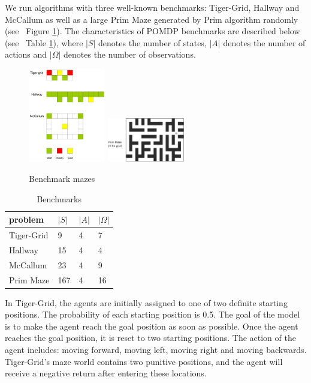 \documentclass{article}
\begin{document}
We run algorithms with three well-known benchmarks: Tiger-Grid, Hallway and McCallum 
as well as a large Prim Maze generated by Prim algorithm randomly
(see ~Figure \ref{fig:mazes}). The characteristics of POMDP benchmarks are described
below (see ~Table \ref{table:benchmarks}), where $|S|$ denotes the number of states,
$|A|$ denotes the number of actions and $|\Omega|$ denotes the number of observations.

\begin{figure}[h]
  \centering
    \includegraphics[width=0.30\textwidth]{mazes.png}
    \includegraphics[width=0.30\textwidth]{06-13-21-48/prim_maze_with_caption.png}
  \caption{Benchmark mazes}
  \label{fig:mazes}
\end{figure}

\begin{table}[h]
  \caption{Benchmarks}
  \label{table:benchmarks}
  \centering
  \begin{tabular}{llll}
    \toprule
    problem         & $|S|$           & $|A|$          & $|\Omega|$\\
    \midrule
    Tiger-Grid      & 9              & 4              & 7        \\
    Hallway         & 15           & 4              & 4        \\
    McCallum        & 23              & 4              & 9        \\
    Prim Maze        & 167              & 4              & 16        \\
    \bottomrule
  \end{tabular}
\end{table}

In Tiger-Grid, the agents are initially assigned to one of two definite starting positions.
The probability of each starting position is 0.5. The goal of the model is to make the agent
reach the goal position as soon as possible. Once the agent reaches the goal position,
it is reset to two starting positions. The action of the agent includes: moving forward, moving left,
moving right and moving backwards. Tiger-Grid's maze world contains two punitive positions,
and the agent will receive a negative return after entering these locations. 
\end{document}
